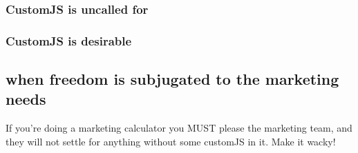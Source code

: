\subsubsection{CustomJS is uncalled for}
\label{subsub:unneeded}

\subsubsection{CustomJS is desirable}
\label{subsub:desireable}

\subsection{when freedom is subjugated to the marketing needs}
\label{sub:marketing}
If you're doing a marketing calculator you MUST please the marketing team, and they will not settle for anything without some customJS in it. Make it wacky!



    
